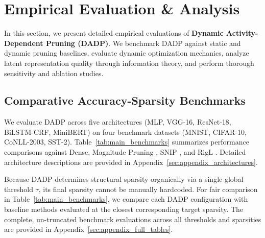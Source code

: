 \section{Empirical Evaluation \& Analysis}

In this section, we present detailed empirical evaluations of \textbf{Dynamic Activity-Dependent Pruning (DADP)}. We benchmark DADP against static and dynamic pruning baselines, evaluate dynamic optimization mechanics, analyze latent representation quality through information theory, and perform thorough sensitivity and ablation studies.

\subsection{Comparative Accuracy-Sparsity Benchmarks}

We evaluate DADP across five architectures (MLP, VGG-16, ResNet-18, BiLSTM-CRF, MiniBERT) on four benchmark datasets (MNIST, CIFAR-10, CoNLL-2003, SST-2). Table~\ref{tab:main_benchmarks} summarizes performance comparisons against Dense, Magnitude Pruning \citep{han2015learning}, SNIP \citep{lee2019snip}, and RigL \citep{evci2020rigging}. Detailed architecture descriptions are provided in Appendix~\ref{sec:appendix_architectures}.

Because DADP determines structural sparsity organically via a single global threshold $\tau$, its final sparsity cannot be manually hardcoded. For fair comparison in Table~\ref{tab:main_benchmarks}, we compare each DADP configuration with baseline methods evaluated at the closest corresponding target sparsity. The complete, un-truncated benchmark evaluations across all thresholds and sparsities are provided in Appendix~\ref{sec:appendix_full_tables}.

